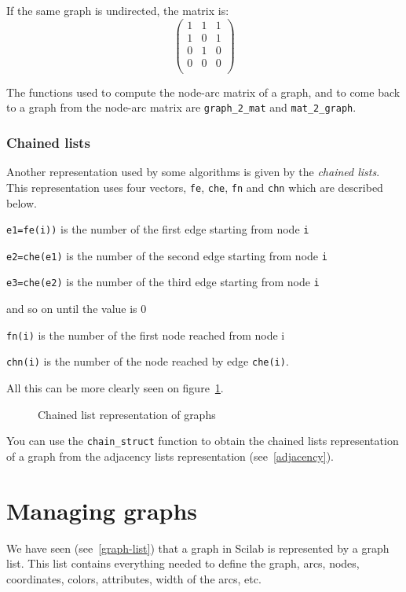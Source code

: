 \documentclass[11pt]{article}
\newcommand{\func}[1]{\texttt{#1}}
\begin{document}
If the same graph is undirected, the matrix is:
\[\left(\begin{array}{cccc}
 1 &  1 &  1 \\
 1 &  0 &  1 \\
 0 &  1 &  0 \\
 0 &  0 &  0 \\
\end{array}\right)\]

The functions used to compute the node-arc matrix
of a graph, and to come back to a graph from the node-arc matrix are
\func{graph\_2\_mat} and \func{mat\_2\_graph}.

\subsubsection{Chained lists}

Another representation used by some algorithms is given by the
\emph{chained lists}. This representation uses four vectors,
\texttt{fe}, \texttt{che}, \texttt{fn} and \texttt{chn} which are
described below.

\texttt{e1=fe(i))} is the number of the first edge starting from node 
\texttt{i}

\texttt{e2=che(e1)} is the number of the second edge starting from
node \texttt{i}

\texttt{e3=che(e2)} is the number of the third edge starting from
node \texttt{i} 

and so on until the value is 0

\texttt{fn(i)} is the number of the first node reached from node i

\texttt{chn(i)} is the number of the node reached by edge
\texttt{che(i)}.

All this can be more clearly seen on figure~\ref{fig-chain}.

\begin{figure}
  \centerline{}
  \caption{Chained list representation of graphs}
  \label{fig-chain}
\end{figure}

You can use the \func{chain\_struct} function to obtain the chained
lists representation of a graph from the adjacency lists representation
(see~\ref{adjacency}).

\section{Managing graphs}

We have seen (see~\ref{graph-list}) that a graph in Scilab is
represented by a graph list. This list contains everything needed to
define the graph, arcs, nodes, coordinates, colors, attributes, width of the
arcs, etc.
\end{document}
